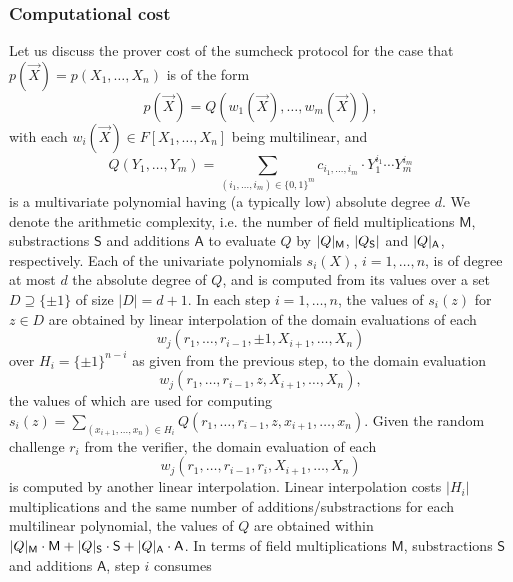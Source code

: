 \documentclass[11pt]{article}
\theoremstyle{definition}
\theoremstyle{remark}
\newtheorem{rem}[thm]{Remark}
\begin{document}
\subsubsection*{Computational cost}

Let us discuss the prover cost of the sumcheck protocol for the case that  $p(\vec X) = p(X_1,\ldots, X_n)$ is of the form
\[
p(\vec X) = Q(w_1(\vec X), \ldots, w_m(\vec X)),
\]
with each $w_i(\vec X)\in F[X_1,\ldots, X_n]$ being multilinear, and 
\[
Q(Y_1,\ldots, Y_m) = \sum_{(i_1,\ldots, i_m)\in \{0,1\}^m} c_{i_1,\ldots, i_m} \cdot Y_1^{i_1}\cdots Y_m^{i_m}
\]
 is a multivariate polynomial having (a typically low) absolute degree $d$.
We denote the arithmetic complexity, i.e. the number of field multiplications $\mathsf M$, substractions $\mathsf S$ and additions $\mathsf A$ to evaluate $Q$ by $|Q|_\textsf M$, $|Q_\textsf S|$ and $|Q|_\textsf A$, respectively.
Each of the univariate polynomials $s_i(X)$, $i=1,\ldots, n$, is of degree at most $d$ the absolute degree of $Q$, and is computed from its values over a set $D\supseteq \{\pm 1\}$ of  size $|D| = d + 1$.
In each step $i=1,\ldots, n$, the values of $s_i(z)$ for $z\in D$ are obtained by linear interpolation of the domain evaluations of each
\[
w_j (r_1,\ldots, r_{i-1}, \pm 1, X_{i+1}, \ldots, X_n)
\]
over $H_{i}=\{\pm 1\}^{n-i}$ as given from the previous step, to the domain evaluation
\[
w_j (r_1,\ldots, r_{i-1}, z, X_{i+1}, \ldots, X_n), 
\]
the values of which are used for computing $s_i(z) = \sum_{(x_{i+1},\ldots, x_n)\in H_{i}} Q(r_1,\ldots, r_{i-1}, z, x_{i+1}, \ldots, x_n)$.
Given the random challenge $r_i$ from the verifier, the domain evaluation of each   
\[
w_j(r_1,\ldots, r_{i-1}, r_i, X_{i+1},\ldots, X_n)
\]
is computed by another linear interpolation.
Linear interpolation costs $|H_i|$ multiplications and the same number of additions/substractions for each multilinear polynomial, the values of $Q$ are obtained within $|Q|_\textsf M \cdot \textsf{M} +   |Q|_\textsf S \cdot \textsf S + |Q|_\textsf A \cdot \textsf A$.  
In terms of field multiplications $\mathsf M$, substractions $\mathsf S$ and additions $\mathsf A$, step $i$ consumes 
\end{document}
